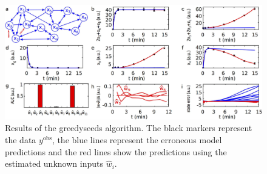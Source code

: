 \begin{figure}[h]
\centering
\includegraphics[scale=0.12]{figures/uvb.png}
\caption{Results of the \textsf{greedyseeds} algorithm. The black markers represent 
the data $y^\text{obs}$, the blue lines represent the erroneous model predictions and 
the red lines show the predictions using the estimated unknown inputs $\hat{w}_i$.}
\label{fig:example}
\end{figure}